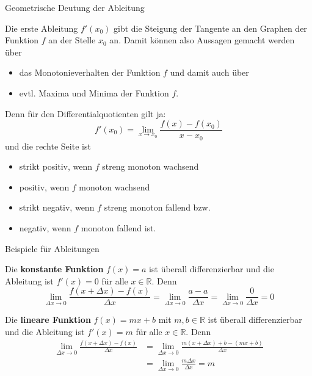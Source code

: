 \begin{frame}{Geometrische Deutung der Ableitung}
	\begin{bemerkung}
		Die erste Ableitung $f'(x_{0})$ gibt die Steigung der Tangente an den Graphen der Funktion $f$ an der Stelle $x_{0}$ an. Damit können also Aussagen gemacht werden über
		\begin{itemize}
			\item das Monotonieverhalten der Funktion $f$ und damit auch über
			\item evtl. Maxima und Minima der Funktion $f$.
		\end{itemize}
		Denn für den Differentialquotienten gilt ja:
		\[
			f'(x_{0}) = \lim_{x \to x_{0}} \frac{f(x)-f(x_{0})}{x-x_{0}} 
		\]
		und die rechte Seite ist 
		\begin{itemize}
			\item strikt positiv, wenn $f$ streng monoton wachsend
			\item positiv, wenn $f$ monoton wachsend
			\item strikt negativ, wenn $f$ streng monoton fallend bzw. 
			\item negativ, wenn $f$ monoton fallend ist.
	\end{itemize}
	\end{bemerkung}
\end{frame}

\begin{frame}{Beispiele für Ableitungen}
	\begin{example}
		Die \textbf{konstante Funktion} $f(x)=a$ ist überall differenzierbar und die Ableitung ist $f'(x) = 0$ für alle $x \in \mathbb{R}$. Denn
		\[
				\lim_{\Delta x \to 0} \frac{f(x+\Delta x) - f(x)}{\Delta x} = \lim_{\Delta x \to 0} \frac{a-a}{\Delta x} = \lim_{\Delta x \to 0} \frac{0}{\Delta x} = 0				
		\]
	\end{example}
	\begin{example}
		Die \textbf{lineare Funktion} $f(x)=mx+b$ mit $m,b \in \mathbb{R}$ ist überall differenzierbar und die Ableitung ist $f'(x) = m$ für alle $x \in \mathbb{R}$. Denn
		\begin{align*}
		\lim_{\Delta x \to 0} \frac{f(x+\Delta x) - f(x)}{\Delta x} & = \lim_{\Delta x \to 0} \frac{m(x+\Delta x)+b - (mx+b)}{\Delta x} \\ &= \lim_{\Delta x \to 0} \frac{m\Delta x}{\Delta x} = m				
		\end{align*}
	\end{example}
\end{frame}

